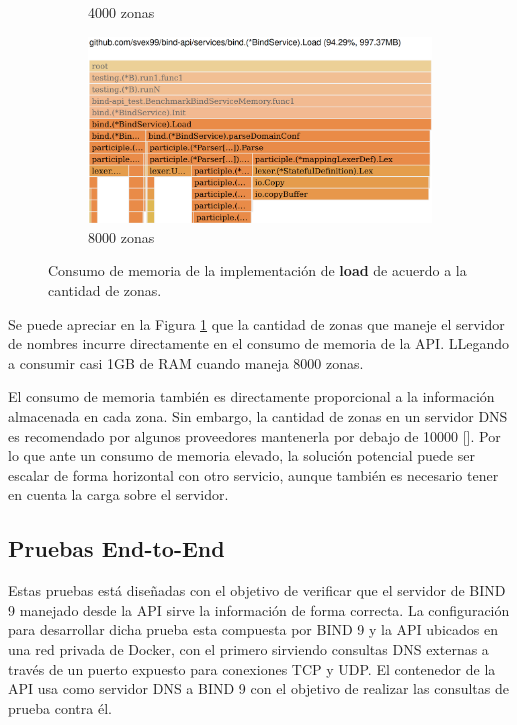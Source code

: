 \begin{figure}
\begin{subfigure}{0.49\textwidth}
        \caption{4000 zonas}
    \end{subfigure}
    \hfill
    \begin{subfigure}{0.49\textwidth}
        \includegraphics[width=\textwidth]{Graphics/mem8000z.png}
        \caption{8000 zonas}
    \end{subfigure}

    \caption{Consumo de memoria de la implementación de \textbf{load} de acuerdo a la cantidad de zonas.}
    \label{fig:bench-mem}
\end{figure}

Se puede apreciar en la Figura \ref{fig:bench-mem} que la cantidad de zonas que maneje el servidor de nombres incurre directamente en el consumo de memoria de la API. LLegando a consumir casi 1GB de RAM cuando maneja 8000 zonas.

El consumo de memoria también es directamente proporcional a la información almacenada en cada zona. Sin embargo, la cantidad de zonas en un servidor DNS es recomendado por algunos proveedores mantenerla por debajo de 10000 [\cite{dns-cap}]. Por lo que ante un consumo de memoria elevado, la solución potencial puede ser escalar de forma horizontal con otro servicio, aunque también es necesario tener en cuenta la carga sobre el servidor.

\subsection{Pruebas End-to-End}

Estas pruebas está diseñadas con el objetivo de verificar que el servidor de BIND 9 manejado desde la API sirve la información de forma correcta. La configuración para desarrollar dicha prueba esta compuesta por BIND 9 y la API ubicados en una red privada de Docker, con el primero sirviendo consultas DNS externas a través de un puerto expuesto para conexiones TCP y UDP. El contenedor de la API usa como servidor DNS a BIND 9 con el objetivo de realizar las consultas de prueba contra él.

